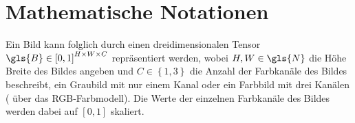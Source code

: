 \section{Mathematische Notationen}
\label{mathematische_notationen}



Ein Bild kann folglich durch einen dreidimensionalen Tensor $\gls{B} \in {\left[0, 1\right]}^{H \times W \times C}$ repräsentiert werden, wobei $H, W \in \gls{N}$ die Höhe \bzw{} Breite des Bildes angeben und $C \in \left\{1, 3\right\}$ die Anzahl der Farbkanäle des Bildes beschreibt, \dhe{} ein Graubild mit nur einem Kanal oder ein Farbbild mit drei Kanälen (\zB{} über das RGB-Farbmodell).
Die Werte der einzelnen Farbkanäle des Bildes werden dabei auf $\left[0, 1\right]$ skaliert.

